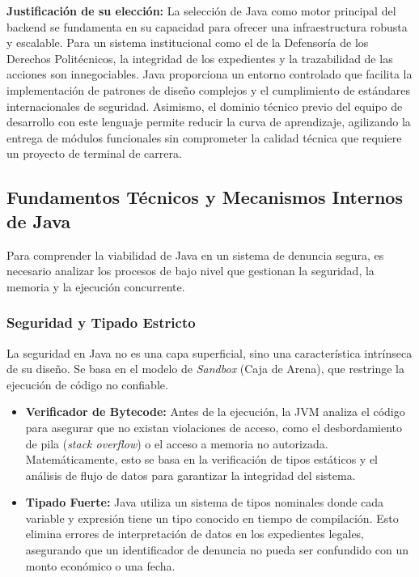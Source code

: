\textbf{Justificación de su elección:}
La selección de Java como motor principal del backend se fundamenta en su capacidad para ofrecer una infraestructura robusta y escalable. Para un sistema institucional como el de la Defensoría de los Derechos Politécnicos, la integridad de los expedientes y la trazabilidad de las acciones son innegociables. Java proporciona un entorno controlado que facilita la implementación de patrones de diseño complejos y el cumplimiento de estándares internacionales de seguridad. Asimismo, el dominio técnico previo del equipo de desarrollo con este lenguaje permite reducir la curva de aprendizaje, agilizando la entrega de módulos funcionales sin comprometer la calidad técnica que requiere un proyecto de terminal de carrera.

\subsection{Fundamentos Técnicos y Mecanismos Internos de Java}

Para comprender la viabilidad de Java en un sistema de denuncia segura, es necesario analizar los procesos de bajo nivel que gestionan la seguridad, la memoria y la ejecución concurrente.

\subsubsection{Seguridad y Tipado Estricto}
La seguridad en Java no es una capa superficial, sino una característica intrínseca de su diseño. Se basa en el modelo de \textit{Sandbox} (Caja de Arena), que restringe la ejecución de código no confiable.
\begin{itemize}
\item \textbf{Verificador de Bytecode:} Antes de la ejecución, la JVM analiza el código para asegurar que no existan violaciones de acceso, como el desbordamiento de pila (\textit{stack overflow}) o el acceso a memoria no autorizada. Matemáticamente, esto se basa en la verificación de tipos estáticos y el análisis de flujo de datos para garantizar la integridad del sistema.
\item \textbf{Tipado Fuerte:} Java utiliza un sistema de tipos nominales donde cada variable y expresión tiene un tipo conocido en tiempo de compilación. Esto elimina errores de interpretación de datos en los expedientes legales, asegurando que un identificador de denuncia no pueda ser confundido con un monto económico o una fecha.
\end{itemize}

